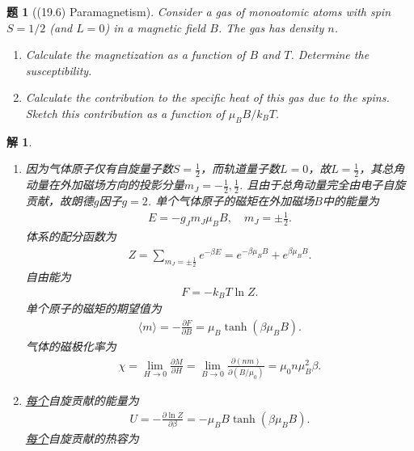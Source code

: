 \documentclass[UTF8,10pt,a4paper]{article}
\theoremstyle{Problem}
\newtheorem{prob}{题}
\theoremstyle{Solution}
\newtheorem*{sol}{解}
\begin{document}
\begin{prob}[(19.6) Paramagnetism]
    Consider a gas of monoatomic atoms with spin $S=1/2$ (and $L=0$) in a magnetic field $B$. The gas has density $n$.
    \begin{enumerate}
        \item[(a)] Calculate the magnetization as a function of $B$ and $T$. Determine the susceptibility.
        \item[(b)] Calculate the contribution to the specific heat of this gas due to the spins. Sketch this contribution as a function of $\mu_BB/k_BT$.
    \end{enumerate}
\end{prob}
\begin{sol}
    \begin{enumerate}
        \item[(a)] 因为气体原子仅有自旋量子数$S=\frac{1}{2}$，而轨道量子数$L=0$，故$L=\frac{1}{2}$，其总角动量在外加磁场方向的投影分量$m_J=-\frac{1}{2},\frac{1}{2}$. 且由于总角动量完全由电子自旋贡献，故朗德$g$因子$g=2$. 单个气体原子的磁矩在外加磁场$B$中的能量为
        \begin{align}
            E=-g_Jm_J\mu_BB,\quad m_J=\pm\frac{1}{2}.
        \end{align}
        体系的配分函数为
        \begin{align}
            Z=\sum_{m_J=\pm\frac{1}{2}}e^{-\beta E}=e^{-\beta\mu_BB}+e^{\beta\mu_BB}.
        \end{align}
        自由能为
        \begin{align}
            F=-k_BT\ln Z.
        \end{align}
        单个原子的磁矩的期望值为
        \begin{align}
            \langle m\rangle=-\frac{\partial F}{\partial B}=\mu_B\tanh(\beta\mu_BB).
        \end{align}
        气体的磁极化率为
        \begin{align}
            \chi=\lim_{H\rightarrow 0}\frac{\partial M}{\partial H}=\lim_{B\rightarrow 0}\frac{\partial(nm)}{\partial(B/\mu_0)}=\mu_0n\mu_B^2\beta.
        \end{align}
        \item[(b)] \uline{每个}自旋贡献的能量为
        \begin{align}
            U=-\frac{\partial\ln Z}{\partial\beta}=-\mu_BB\tanh(\beta\mu_BB).
        \end{align}
        \uline{每个}自旋贡献的热容为
        \begin{align}

\end{align}
\end{enumerate}
\end{sol}
\end{document}

